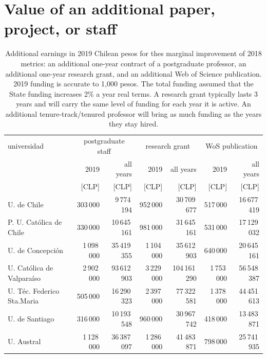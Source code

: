 \documentclass[twocolumn]{article}
\begin{document}
\section{Value of an additional paper, project, or staff}
\begin{table}[t]
\centering
\caption{Additional earnings in 2019 Chilean pesos for thes marginal improvement of 2018 metrics: an additional one-year contract of a postgraduate professor, an additional one-year research grant, and an additional Web of Science publication.  2019 funding is accurate to 1,000 pesos. The total funding assumed that the State funding increases 2\% a year real terms.  A research grant typically lasts 3 years and will carry the same level of funding for each year it is active.  An additional tenure-track/tenured professor will bring as much funding as the years they stay hired.}
\label{tab:sciencecost}
\begin{tabular}{l rr rr rr}
\hline\hline
universidad                    & \multicolumn{2}{c}{postgraduate staff} & \multicolumn{2}{c}{research grant} & \multicolumn{2}{c}{WoS publication} \\
                               & 2019        & all years     & 2019        & all years     & 2019        & all years     \\
                               & [CLP]       & [CLP]         & [CLP]       & [CLP]         & [CLP]       & [CLP]         \\
\hline
U. de Chile                    &     303\,000 &     9\,774\,194 &     952\,000 &    30\,709\,677 &     517\,000 &    16\,677\,419 \\
P. U. Católica de Chile        &     330\,000 &    10\,645\,161 &     981\,000 &    31\,645\,161 &     531\,000 &    17\,129\,032 \\
U. de Concepción               &   1\,098\,000 &    35\,419\,355 &   1\,104\,000 &    35\,612\,903 &     640\,000 &    20\,645\,161 \\
U. Católica de Valparaíso      &   2\,902\,000 &    93\,612\,903 &   3\,229\,000 &   104\,161\,290 &   1\,753\,000 &    56\,548\,387 \\
U. Téc. Federico Sta.Maria     &     505\,000 &    16\,290\,323 &   2\,397\,000 &    77\,322\,581 &   1\,378\,000 &    44\,451\,613 \\
U. de Santiago                 &     316\,000 &    10\,193\,548 &     960\,000 &    30\,967\,742 &     418\,000 &    13\,483\,871 \\
U. Austral                     &   1\,128\,000 &    36\,387\,097 &   1\,286\,000 &    41\,483\,871 &     798\,000 &    25\,741\,935 \\

\end{tabular}
\end{table}
\end{document}

